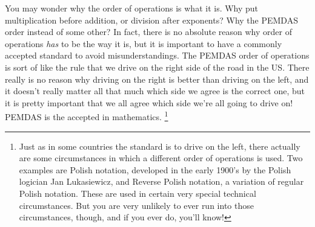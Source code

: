 



\bigskip

You may wonder why the order of operations is what it is. Why put multiplication before addition, or division after exponents? Why the PEMDAS order instead of some other? In fact, there is no absolute reason why order of operations \textit{has} to be the way it is, but it is important to have a commonly accepted standard to avoid misunderstandings. The PEMDAS order of operations is sort of like the rule that we drive on the right side of the road in the US. There really is no reason why driving on the right is better than driving on the left, and it doesn’t really matter all that much which side we agree is the correct one, but it is pretty important that we all agree which side we’re all going to drive on! PEMDAS is the accepted  in mathematics. \footnote{Just as in some countries the standard is to drive on the left, there actually are some circumstances in which a 	different order of operations is used. Two examples are Polish notation, developed in the early 1900’s by the 	Polish logician Jan Lukasiewicz, and Reverse Polish notation, a variation of regular Polish notation. These are used in certain very special technical circumstances. But you are very unlikely to ever run into those circumstances, though, and if you ever do, you’ll know!}

